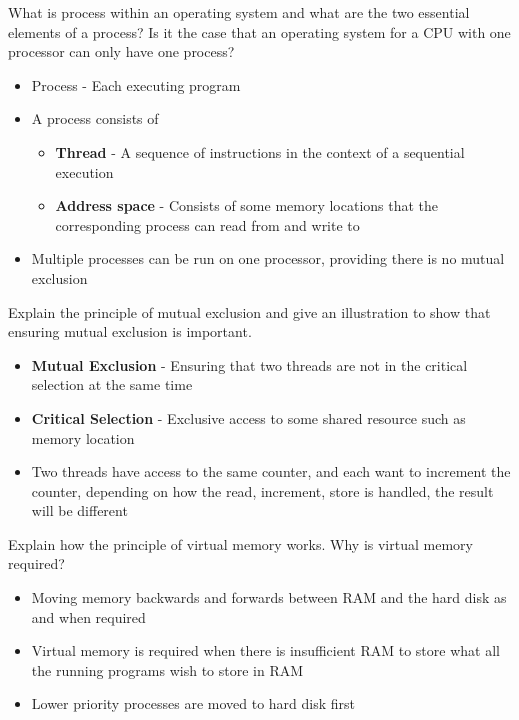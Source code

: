 \documentclass{exam}
\begin{document}
\begin{questions}
\question[5]What is process within an operating system and what are the two essential elements of a process? Is it the case that an operating system for a CPU with one processor can only have one process?
\begin{solution}[2in]
\begin{itemize}
	\item Process - Each executing program
	\item A process consists of
	\begin{itemize}
		\item \textbf{Thread} - A sequence of instructions in the context of a sequential execution
		\item \textbf{Address space} - Consists of some memory locations that the corresponding process can read from and write to
	\end{itemize}
	\item Multiple processes can be run on one processor, providing there is no mutual exclusion 
\end{itemize}
\end{solution}

\question[6]Explain the principle of mutual exclusion and give an illustration to show that ensuring mutual exclusion is important.
\begin{solution}[2in]
\begin{itemize}
	\item \textbf{Mutual Exclusion} - Ensuring that two threads are not in the critical selection at the same time
	\item \textbf{Critical Selection} - Exclusive access to some shared resource such as memory location
	\item  Two threads have access to the same counter, and each want to increment the counter, depending on how the read, increment, store is handled, the result will be different
\end{itemize}
\end{solution}

\question[3]Explain how the principle of virtual memory works. Why is virtual memory required?
\begin{solution}[2in]
\begin{itemize}
	\item Moving memory backwards and forwards between RAM and the hard disk as and when required
	\item Virtual memory is required when there is insufficient RAM to store what all the running programs wish to store in RAM
	\item Lower priority processes are moved to hard disk first
\end{itemize}
\end{solution}


\end{questions}
\end{document}
